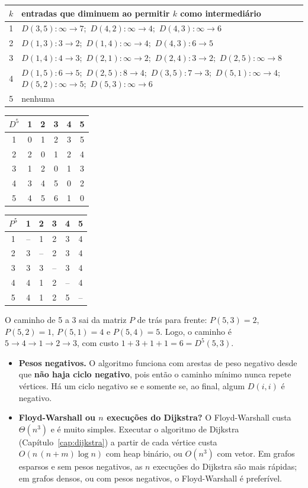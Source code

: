 \begin{exemplo}\label{ex:fwcompleto}\leavevmode
\begin{center}\small
\begin{tabularx}{\linewidth}{c|X}
$k$ & entradas que diminuem ao permitir $k$ como intermediário\\ \hline
1 & $D(3,5)\!:\infty\to7$;\ $D(4,2)\!:\infty\to4$;\ $D(4,3)\!:\infty\to6$\\
2 & $D(1,3)\!:3\to2$;\ $D(1,4)\!:\infty\to4$;\ $D(4,3)\!:6\to5$\\
3 & $D(1,4)\!:4\to3$;\ $D(2,1)\!:\infty\to2$;\ $D(2,4)\!:3\to2$;\ $D(2,5)\!:\infty\to8$\\
4 & $D(1,5)\!:6\to5$;\ $D(2,5)\!:8\to4$;\ $D(3,5)\!:7\to3$;\ $D(5,1)\!:\infty\to4$;\ $D(5,2)\!:\infty\to5$;\ $D(5,3)\!:\infty\to6$\\
5 & nenhuma
\end{tabularx}
\end{center}
\begin{center}\small
\begin{tabular}{c|ccccc}
$D^5$ & 1 & 2 & 3 & 4 & 5\\ \hline
1 & 0 & 1 & 2 & 3 & 5\\
2 & 2 & 0 & 1 & 2 & 4\\
3 & 1 & 2 & 0 & 1 & 3\\
4 & 3 & 4 & 5 & 0 & 2\\
5 & 4 & 5 & 6 & 1 & 0
\end{tabular}
\qquad
\begin{tabular}{c|ccccc}
$P^5$ & 1 & 2 & 3 & 4 & 5\\ \hline
1 & -- & 1 & 2 & 3 & 4\\
2 & 3 & -- & 2 & 3 & 4\\
3 & 3 & 3 & -- & 3 & 4\\
4 & 4 & 1 & 2 & -- & 4\\
5 & 4 & 1 & 2 & 5 & --
\end{tabular}
\end{center}
O caminho de 5 a 3 sai da matriz $P$ de trás para frente: $P(5,3)=2$, $P(5,2)=1$, $P(5,1)=4$ e $P(5,4)=5$. Logo, o caminho é $5\to4\to1\to2\to3$, com custo $1+3+1+1=6=D^5(5,3)$.
\end{exemplo}
\begin{itemize}
  \item \textbf{Pesos negativos.} O algoritmo funciona com arestas de peso negativo desde que \textbf{não haja ciclo negativo}, pois então o caminho mínimo nunca repete vértices. Há um ciclo negativo se e somente se, ao final, algum $D(i,i)$ é negativo.
  \item \textbf{Floyd-Warshall ou $n$ execuções do Dijkstra?} O Floyd-Warshall custa $\Theta(n^3)$ e é muito simples. Executar o algoritmo de Dijkstra (Capítulo~\ref{cap:dijkstra}) a partir de cada vértice custa $O(n\,(n+m)\log n)$ com heap binário, ou $O(n^3)$ com vetor. Em grafos esparsos e sem pesos negativos, as $n$ execuções do Dijkstra são mais rápidas; em grafos densos, ou com pesos negativos, o Floyd-Warshall é preferível.
\end{itemize}

